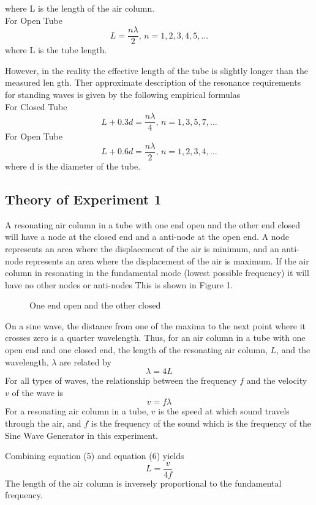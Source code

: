 \documentclass[12pt]{article}
\begin{document}
    where L is the length of the air column. \\
    For Open Tube
    \begin{equation}
        L = \frac{n\lambda}{2},\, n = 1, 2, 3, 4, 5, ...
    \end{equation}
    where L is the tube length. \par
    However, in the reality the effective length of the tube is slightly longer than the measured len gth. Ther approximate description of the resonance requirements for standing waves is given by the following empirical formulas\\
    For Closed Tube
    \begin{equation}
        L+0.3d = \frac{n\lambda}{4},\, n = 1, 3, 5, 7, ...
    \end{equation}
    For Open Tube
    \begin{equation}
        L + 0.6d = \frac{n\lambda}{2},\, n = 1, 2, 3, 4, ...
    \end{equation}
    where d is the diameter of the tube.
    \subsection{Theory of Experiment 1}
    A resonating air column in a tube with one end open and the other end closed will have a node at the closed end and a anti-node at the open end. A node represents an area where the displacement of the air is minimum, and an anti-node represents an area where the displacement of the air is maximum. If the air column in resonating in the fundamental mode (lowest possible frequency) it will have no other nodes or anti-nodes This is shown in Figure 1. \par
    \begin{figure}[H]
    	\centering
    	\caption{One end open and the other closed}
    \end{figure}
    
    On a sine wave, the distance from one of the maxima to the next point where it crosses zero is a quarter wavelength. Thus, for an air column in a tube with one open end and one closed end, the length of the resonating air column, $L$, and the wavelength, $\lambda$ are related by
    \begin{equation}
        \lambda = 4L
    \end{equation}
    For all types of waves, the relationship between the frequency $f$ and the velocity $v$ of the wave is 
    \begin{equation}
    	v = f \lambda
    \end{equation}
    For a resonating air column in a tube, $v$ is the speed at which sound travels through the air, and $f$ is the frequency of the sound which is the frequency of the Sine Wave Generator in this experiment. \par
    Combining equation (5) and equation (6) yields
    \begin{equation}
    	L = \frac{v}{4f}
    \end{equation} 
 	The length of the air column is inversely proportional to the fundamental frequency.
\end{document}
